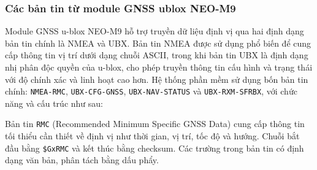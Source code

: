 \documentclass[../DoAn.tex]{subfiles}
\begin{document}
\subsubsection{Các bản tin từ module GNSS ublox NEO-M9}
\label{subsubsection:4.2.2.1}
Module GNSS u-blox NEO-M9 hỗ trợ truyền dữ liệu định vị qua hai định dạng bản tin chính là NMEA và UBX. Bản tin NMEA được sử dụng phổ biến để cung cấp thông tin vị trí dưới dạng chuỗi ASCII, trong khi bản tin UBX là định dạng nhị phân độc quyền của u-blox, cho phép truyền thông tin cấu hình và trạng thái với độ chính xác và linh hoạt cao hơn. Hệ thống phần mềm sử dụng bốn bản tin chính: \texttt{NMEA-RMC}, \texttt{UBX-CFG-GNSS}, \texttt{UBX-NAV-STATUS} và \texttt{UBX-RXM-SFRBX}, với chức năng và cấu trúc như sau:

Bản tin \texttt{RMC} (Recommended Minimum Specific GNSS Data) cung cấp thông tin tối thiểu cần thiết về định vị như thời gian, vị trí, tốc độ và hướng. Chuỗi bắt đầu bằng \texttt{\$GxRMC} và kết thúc bằng checksum. Các trường trong bản tin có định dạng văn bản, phân tách bằng dấu phẩy.
\end{document}
